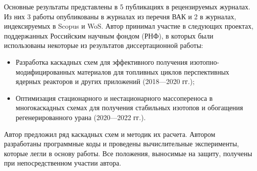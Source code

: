 Основные результаты представлены в 5 публикациях в рецензируемых журналах. Из них 3 работы опубликованы в журналах из перечня ВАК и 2 в журналах, индексируемых в Scopus и WoS. Автор принимал участие в следующих проектах, поддержанных Российским научным фондом (РНФ), в которых были использованы некоторые из результатов диссертационной работы: 
\begin{itemize}[leftmargin=0.4cm]
  \item Разработка каскадных схем для эффективного получения изотопно-модифицированных материалов для топливных циклов перспективных ядерных реакторов и других приложений (2018---2020 гг.);
  \item Оптимизация стационарного и нестационарного массопереноса в многокаскадных схемах для получения стабильных изотопов и обогащения регенерированного урана (2020---2022 гг.).
\end{itemize}


{\contribution} Автор предложил ряд каскадных схем и методик их расчета. Автором разработаны программные коды и проведены вычислительные эксперименты, которые легли в основу работы. Все положения, выносимые на защиту, получены при непосредственном участии автора.